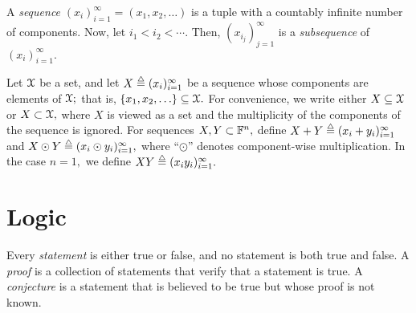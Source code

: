 \begin{defin}  \label{defin:nine5} {\rm
%
%
\label{sequencesym}%
%
A {\it sequence} $(x_i)^{\infty}_{i=1} = (x_1,x_2,\ldots)$ is a tuple with a
countably infinite number of components. Now, let $i_1 < i_2 < \cdots.$ Then, $(x_{i_j} )^{\infty}_{j=1}$ is a {\it subsequence} of
$(x_i)^{\infty}_{i=1}.$
%
}\end{defin}


Let ${\mathcal X}$ be a set, and let $X\isdef(x_i)_{i=1}^\infty$ be a sequence whose components are elements of ${\mathcal X};$ that is, $\{x_1,x_2,\ldots\}\subseteq{\mathcal X}.$
%
For convenience, we write either $X\subseteq {\mathcal X}$ or $X\subset {\mathcal X},$  where $X$ is viewed as a set and the multiplicity of the components of the sequence is ignored.
%
For sequences $X,Y\subset{\mathbb F}^n,$ define $X + Y\isdef (x_i + y_i)_{i=1}^\infty$ and $X\odot Y\isdef (x_i\odot y_i)_{i=1}^\infty,$ where ``$\odot$'' denotes component-wise multiplication.  In the case $n=1,$ we define $XY\isdef (x_i y_i)_{i=1}^\infty.$












%


\section{Logic}


Every {\it statement} is either true or false, and no statement is both true and false.
%
%
%
%
A {\it proof} is a collection of statements that verify that a statement is true.
%
%
A {\it conjecture} is a statement that is believed to be true but whose proof is not known.
%
%
%




